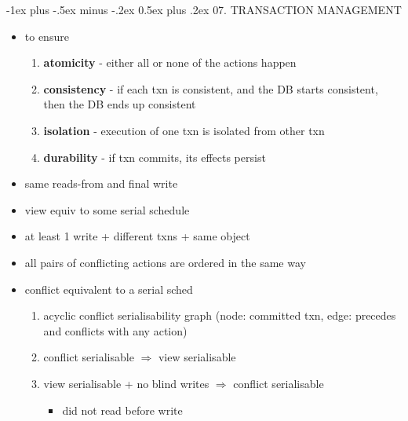 \documentclass[10pt, landscape]{article}
\makeatletter
\renewcommand{\section}{\@startsection{section}{1}{0mm}%
  {-1ex plus -.5ex minus -.2ex}%
  {0.5ex plus .2ex}%
{\normalfont\large\bfseries}}
\makeatother
\begin{document}
\begin{multicols*}{4}
  \section{07. TRANSACTION MANAGEMENT}

  \begin{itemize}
    \item to ensure  
      \begin{enumerate}
        \item \textbf{atomicity} - either all or none of the actions happen
        \item \textbf{consistency} - if each txn is consistent, and the DB starts consistent, then the DB ends up consistent
        \item \textbf{isolation} - execution of one txn is isolated from other txn
        \item \textbf{durability} - if txn commits, its effects persist
      \end{enumerate}
  \end{itemize}

  \begin{itemize}
    \item {} same reads-from and final write
    \item {} view equiv to some serial schedule
    \item {} at least 1 write + different txns + same object
    \item {} all pairs of conflicting actions are ordered in the same way
  \end{itemize}

  \begin{itemize}
    \item {} conflict equivalent to a serial sched
      \begin{enumerate}
        \item acyclic conflict serialisability graph (node: committed txn, edge: precedes and conflicts with any action)
        \item conflict serialisable $\Rightarrow$ view serialisable
        \item view serialisable + no blind writes $\Rightarrow$ conflict serialisable
          \begin{itemize}
            \item {} did not read before write
          \end{itemize}
      \end{enumerate}
  \end{itemize}


\end{multicols*}
\end{document}
